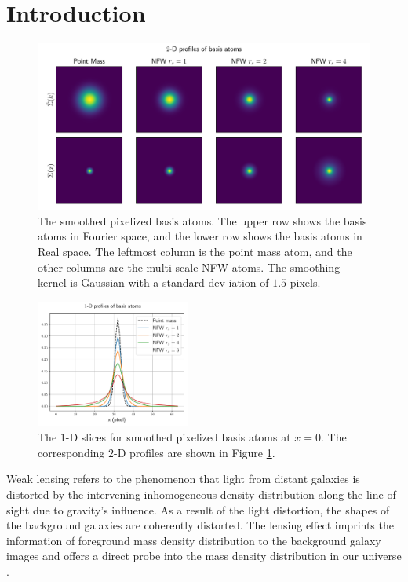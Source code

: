 \documentclass[twocolumn]{aastex63}
\begin{document}
\section{Introduction}

\begin{figure}[!t] \includegraphics[width=1.\textwidth]{nfwlet-atom-2D.pdf}
    \caption{The smoothed pixelized basis atoms. The upper row shows the basis
        atoms in Fourier space, and the lower row shows the basis atoms in Real
        space.  The leftmost column is the point mass atom, and the other
        columns are the multi-scale NFW atoms.  The smoothing kernel is
        Gaussian with a standard dev iation of $1.5$ pixels.
    } \label{fig_atoms2D}
\end{figure}

\begin{figure}
 \includegraphics[width=0.45\textwidth]{nfwlet-atom-1D.pdf}
    \caption{The $1$-D slices for smoothed pixelized basis atoms at $x=0$. The
        corresponding $2$-D profiles are shown in Figure \ref{fig_atoms2D}.
    }
 \label{fig_atoms1D}
\end{figure}

Weak lensing refers to the phenomenon that light from distant galaxies is
distorted by the intervening inhomogeneous density distribution along the line
of sight due to gravity's influence.
As a result of the light distortion, the shapes of the background galaxies are
coherently distorted. The lensing effect imprints the information of
foreground mass density distribution to the background galaxy images and offers
a direct probe into the mass density distribution in our universe
\citep[see][for recent reviews]{revKilbinger15,revRachel17}.
\end{document}
